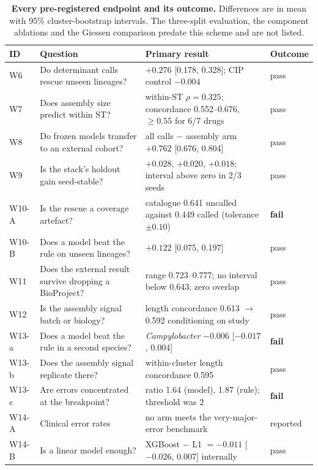 \begin{table}[t]\centering\small
\caption{\textbf{Every pre-registered endpoint and its outcome.} Differences are in mean \nap{}
with 95\% cluster-bootstrap intervals. The three-split evaluation, the component ablations and the
Giessen comparison predate this scheme and are not listed.}\label{tab:prereg}
\begin{tabularx}{\linewidth}{llXl}
\toprule
ID & Question & Primary result & Outcome \\
\midrule
W6 & Do determinant calls rescue unseen lineages? & $+0.276$ [0.178, 0.328]; CIP control $-0.004$ & pass \\
W7 & Does assembly size predict within ST? & within-ST $\rho = 0.325$; concordance 0.552--0.676, $\ge 0.55$ for 6/7 drugs & pass \\
W8 & Do frozen models transfer to an external cohort? & all calls $-$ assembly arm $+0.762$ [0.676, 0.804] & pass \\
W9 & Is the stack's holdout gain seed-stable? & $+0.028$, $+0.020$, $+0.018$; interval above zero in 2/3 seeds & pass \\
W10-A & Is the rescue a coverage artefact? & catalogue \nap{} 0.641 uncalled against 0.449 called (tolerance $\pm0.10$) & \textbf{fail} \\
W10-B & Does a model beat the rule on unseen lineages? & $+0.122$ [0.075, 0.197] & pass \\
W11 & Does the external result survive dropping a BioProject? & range 0.723--0.777; no interval below 0.643; zero overlap & pass \\
W12 & Is the assembly signal batch or biology? & length concordance 0.613 $\rightarrow$ 0.592 conditioning on study & pass \\
W13-a & Does a model beat the rule in a second species? & \textit{Campylobacter} $-0.006$ [$-0.017$, 0.004] & \textbf{fail} \\
W13-b & Does the assembly signal replicate there? & within-cluster length concordance 0.595 & pass \\
W13-c & Are errors concentrated at the breakpoint? & ratio 1.64 (model), 1.87 (rule); threshold was 2 & \textbf{fail} \\
W14-A & Clinical error rates & no arm meets the very-major-error benchmark & reported \\
W14-B & Is a linear model enough? & XGBoost $-$ L1 $= -0.011$ [$-0.026$, 0.007] internally & pass \\
\bottomrule
\end{tabularx}
\end{table}

